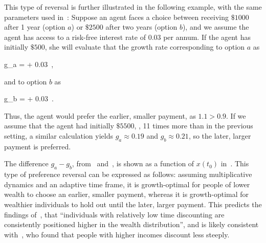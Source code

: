 
This type of reversal is further illustrated in the following example, with the same parameters used in~: Suppose an agent faces a choice between receiving $\$1000$ after 1 year (option $a$) or $\$2500$ after two years (option $b$), and we assume the agent has access to a risk-free interest rate of 0.03 per annum. If the agent has initially $\$500$, she will evaluate that the growth rate corresponding to option $a$ as

\be
g_a =  + 0.03 \,,
\ee

and to option $b$ as

\be
g_b =  + 0.03 \,.
\ee

Thus, the agent would prefer the earlier, smaller payment, as $1.1 > 0.9$. If we assume that the agent had initially $\$5500$, \ie, 11 times more than in the previous setting, a similar calculation yields $g_a\approx0.19$ and $g_b\approx0.21$, so the later, larger payment is preferred.%

The difference $g_a-g_b$, from~ and~, is shown as a function of $x\left(t_0\right)$ in~. This type of preference reversal can be expressed as follows: assuming multiplicative dynamics and an adaptive time frame, it is growth-optimal for people of lower wealth to choose an earlier, smaller payment, whereas it is growth-optimal for wealthier individuals to hold out until the later, larger payment. This predicts the findings of~\citet{EpperETAL2018}, that ``individuals with relatively low time discounting are consistently positioned higher in the wealth distribution'', and is likely consistent with~\citet{GreenETAL1996}, who found that people with higher incomes discount less steeply.


